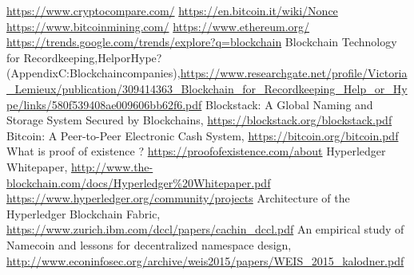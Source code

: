 \documentclass[a4paper]{article}
\begin{document}
\begin{thebibliography}{9}
\url{https://www.cryptocompare.com/}
\url{https://en.bitcoin.it/wiki/Nonce}
\url{https://www.bitcoinmining.com/}
\url{https://www.ethereum.org/}
\url{https://trends.google.com/trends/explore?q=blockchain}
 Blockchain Technology for Recordkeeping,\enspace Help\enspace or\enspace Hype\enspace ?\enspace (Appendix\enspace C:\enspace Blockchain\enspace companies),\newline \url{https://www.researchgate.net/profile/Victoria_Lemieux/publication/309414363_Blockchain_for_Recordkeeping_Help_or_Hype/links/580f539408ae009606bb62f6.pdf}
Blockstack: A Global Naming and Storage System Secured by Blockchains, \url{https://blockstack.org/blockstack.pdf}
Bitcoin: A Peer-to-Peer Electronic Cash System, \url{https://bitcoin.org/bitcoin.pdf} 
What is proof of existence ? \url{https://proofofexistence.com/about}
Hyperledger Whitepaper, \url{http://www.the-blockchain.com/docs/Hyperledger\%20Whitepaper.pdf} 
\url{https://www.hyperledger.org/community/projects}
Architecture of the Hyperledger Blockchain Fabric, \url{https://www.zurich.ibm.com/dccl/papers/cachin_dccl.pdf}
An empirical study of Namecoin and lessons for decentralized namespace design, \url{http://www.econinfosec.org/archive/weis2015/papers/WEIS_2015_kalodner.pdf}
\end{thebibliography}
\end{document}
